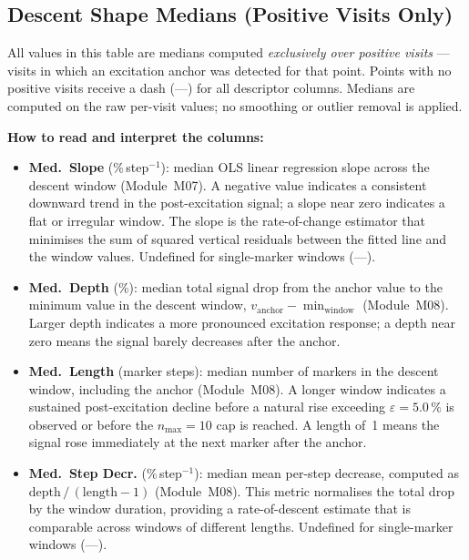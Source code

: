 \documentclass[a4paper,11pt]{article}
\begin{document}
\subsection{Descent Shape Medians (Positive Visits Only)}

All values in this table are medians computed \emph{exclusively over positive visits} ---
visits in which an excitation anchor was detected for that point. Points with no positive
visits receive a dash (---) for all descriptor columns.
Medians are computed on the raw per-visit values; no smoothing or outlier removal is
applied.

\medskip
\noindent\textbf{How to read and interpret the columns:}

\begin{itemize}

  \item \textbf{Med.\ Slope} (\%\,step$^{-1}$): median OLS linear regression slope across
        the descent window (Module~M07). A negative value indicates a consistent downward
        trend in the post-excitation signal; a slope near zero indicates a flat or irregular
        window. The slope is the rate-of-change estimator that minimises the sum of squared
        vertical residuals between the fitted line and the window values. Undefined for
        single-marker windows (---).

  \item \textbf{Med.\ Depth} (\%): median total signal drop from the anchor value to the
        minimum value in the descent window,
        $v_{\mathrm{anchor}} - \min_{\mathrm{window}}$ (Module~M08). Larger depth indicates
        a more pronounced excitation response; a depth near zero means the signal barely
        decreases after the anchor.

  \item \textbf{Med.\ Length} (marker steps): median number of markers in the descent
        window, including the anchor (Module~M08). A longer window indicates a sustained
        post-excitation decline before a natural rise exceeding
        $\varepsilon = 5.0\,\%$ is observed or before the
        $n_{\max} = 10$ cap is reached. A length of~1 means the signal rose
        immediately at the next marker after the anchor.

  \item \textbf{Med.\ Step Decr.} (\%\,step$^{-1}$): median mean per-step decrease,
        computed as $\mathrm{depth}\,/\,(\mathrm{length} - 1)$ (Module~M08). This metric
        normalises the total drop by the window duration, providing a rate-of-descent
        estimate that is comparable across windows of different lengths. Undefined for
        single-marker windows (---).

\end{itemize}
\end{document}
